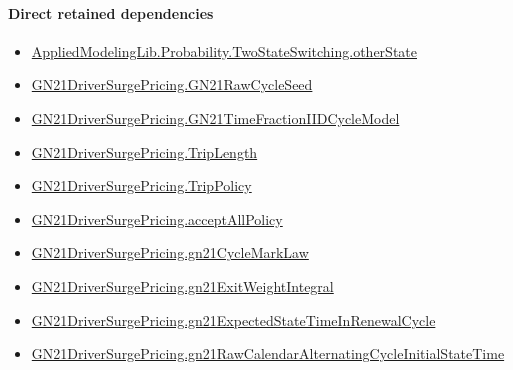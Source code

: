 \documentclass[10pt]{article}
\begin{document}
\paragraph{Direct retained dependencies}
\begin{itemize}\raggedright
\item \hyperlink{governing-declaration-befc3a82e4090595}{Applied\allowbreak{}Modeling\allowbreak{}Lib.\allowbreak{}Probability.\allowbreak{}Two\allowbreak{}State\allowbreak{}Switching.\allowbreak{}other\allowbreak{}State}
\item \hyperlink{governing-declaration-228de34d5811f602}{GN21\allowbreak{}Driver\allowbreak{}Surge\allowbreak{}Pricing.\allowbreak{}GN21\allowbreak{}Raw\allowbreak{}Cycle\allowbreak{}Seed}
\item \hyperlink{paper-prerequisite-be12410503a9b0bd}{GN21\allowbreak{}Driver\allowbreak{}Surge\allowbreak{}Pricing.\allowbreak{}GN21\allowbreak{}Time\allowbreak{}Fraction\allowbreak{}IID\allowbreak{}Cycle\allowbreak{}Model}
\item \hyperlink{governing-declaration-a616c143f22cf2bc}{GN21\allowbreak{}Driver\allowbreak{}Surge\allowbreak{}Pricing.\allowbreak{}Trip\allowbreak{}Length}
\item \hyperlink{governing-declaration-4312ad4cb899871f}{GN21\allowbreak{}Driver\allowbreak{}Surge\allowbreak{}Pricing.\allowbreak{}Trip\allowbreak{}Policy}
\item \hyperlink{governing-declaration-e94c9281d4f4b12d}{GN21\allowbreak{}Driver\allowbreak{}Surge\allowbreak{}Pricing.\allowbreak{}accept\allowbreak{}All\allowbreak{}Policy}
\item \hyperlink{governing-declaration-efacc1fa91256093}{GN21\allowbreak{}Driver\allowbreak{}Surge\allowbreak{}Pricing.\allowbreak{}gn21\allowbreak{}Cycle\allowbreak{}Mark\allowbreak{}Law}
\item \hyperlink{governing-declaration-14f0a8679c69b067}{GN21\allowbreak{}Driver\allowbreak{}Surge\allowbreak{}Pricing.\allowbreak{}gn21\allowbreak{}Exit\allowbreak{}Weight\allowbreak{}Integral}
\item \hyperlink{governing-declaration-a2f3851e21861428}{GN21\allowbreak{}Driver\allowbreak{}Surge\allowbreak{}Pricing.\allowbreak{}gn21\allowbreak{}Expected\allowbreak{}State\allowbreak{}Time\allowbreak{}In\allowbreak{}Renewal\allowbreak{}Cycle}
\item \hyperlink{governing-declaration-dc83c84bf96f074a}{GN21\allowbreak{}Driver\allowbreak{}Surge\allowbreak{}Pricing.\allowbreak{}gn21\allowbreak{}Raw\allowbreak{}Calendar\allowbreak{}Alternating\allowbreak{}Cycle\allowbreak{}Initial\allowbreak{}State\allowbreak{}Time}

\end{itemize}
\end{document}
